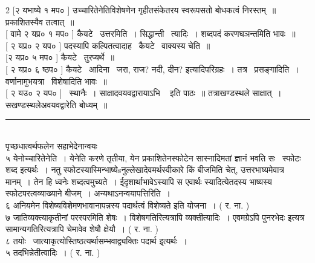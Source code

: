 \documentclass[11pt, openany]{book}
\begin{document}
\begin{multicols}{2}
[२ यभाष्ये १ मप० ] उच्चारितेनेतिविशेषणेन गृहीतसंकेतरय स्वरूपसतो बोधकत्वं निरस्तम्~॥ प्रकाशितस्यैव तत्वात्~॥\\

[ वामे २ यप्र० १ मप० ] कैयटे \textendash\ उत्तरमिति~। सिद्धान्ती \textendash\ त्यादिः~।  शब्दपदं करणघञन्तमिति भावः~॥\\

[ २ यप्र० २ यप० ] पदस्यापि कल्पितत्वादाह \textendash\ कैयटे \textendash\ वाक्यस्य चेति~॥\\

[२ यप्र० ५ मप० ] कैयटे \textendash\ तुरप्यर्थे~॥\\

[ २ यप्र० ६ ष्ठप० ] कैयटे \textendash\ आदिना \textendash\ {\qt जरा, राज?} नदी, दीन? इत्यादिपरिग्रहः~। तत्र \textendash\ प्रसङ्गादिति~। वर्णानामुभयत्रा \textendash\ विशेषादिति भावः~॥\\

[ २ यउ० २ यप० ] \textendash\ स्थानैः~। {\qt साक्षादवयवद्वारायाऽभि \textendash\ } इति पाठः~॥ तत्राखण्डस्थले साक्षात्~। सखण्डस्थलेअवयवद्वारेति बोध्यम्~॥

\noindent
\rule{1\linewidth}{0.5pt}\\

\noindent
पृच्छधात्वर्थफलेन सहाभेदेनान्वयः\\

५ येनोच्चारितेनेति~। येनेति करणे तृतीया, येन प्रकाशितेनस्फोटेन सास्नादिमतां ज्ञानं भवति सः \textendash\ स्फोटः शब्द इत्यर्थः~। नतु स्फोटस्यास्मिन्भाष्येsनुल्लेखादेवमर्थस्वीकारे किं बीजमिति चेत्, उत्तरभाष्यमेवात्र मानम्~। तेन हि ध्वनेः शब्दत्वमुच्यते~।  ई्दृशार्थाभावेऽस्यापि स एवार्थः स्यादित्येतदस्य भाष्यस्य स्फोटपरत्वव्याख्याने बीजम्~। अन्यथाऽनन्वयापत्तिरिति~।\\

६ अनियमेन विशेष्यविशेमणभावानापन्नस्य पदार्थत्वं विशेष्यते इति योजना~। ( र. ना. )\\

७ जातिव्यक्त्याकृतीनां परस्परमिति शेषः~। विशेषगतिरित्यत्रापि व्यक्तीत्यादिः~। एवमग्रेऽपि {\qt पुनरभेदः} इत्यत्र {\qt सामान्यगति}रित्यत्रापि चेमावेव शेषौ क्षेयौ~। ( र. ना. )\\

८ तयोः \textendash\ जात्याकृत्योस्तिष्ठत्यर्थासम्भवाद्व्यक्तिः पदार्थ इ्त्यर्थः~।\\

५ तदभिन्नेतीत्वादिः~। ( र. ना. )
\end{multicols}

\newpage
\end{document}
